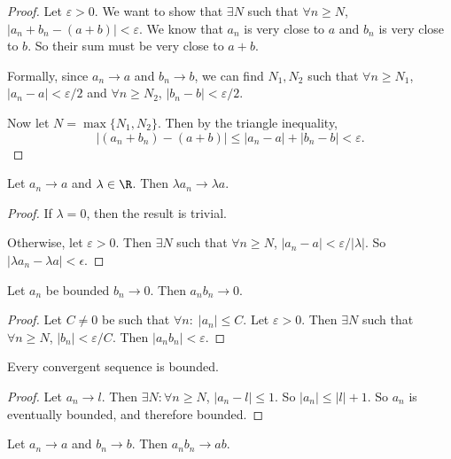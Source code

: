 \documentclass[a4paper]{article}
\begin{document}
\begin{proof}
  Let $\varepsilon > 0$. We want to show that $\exists N$ such that $\forall n \geq N$, $|a_n + b_n - (a+b)| < \varepsilon$. We know that $a_n$ is very close to $a$ and $b_n$ is very close to $b$. So their sum must be very close to $a + b$.
  
  Formally, since $a_n\to a$ and $b_n \to b$, we can find $N_1, N_2$ such that $\forall n \geq N_1$, $|a_n - a| < \varepsilon/2$ and $\forall n \geq N_2$, $|b_n - b| < \varepsilon/2$.

  Now let $N = \max\{N_1, N_2\}$. Then by the triangle inequality, 
  \[
    |(a_n + b_n) - (a + b)| \leq |a_n - a| + |b_n - b| < \varepsilon.
  \]
\end{proof}

\begin{lemma}
  Let $a_n \to a$ and $\lambda \in \R$. Then $\lambda a_n \to \lambda a$. 
\end{lemma}

\begin{proof}
  If $\lambda = 0$, then the result is trivial.

  Otherwise, let $\varepsilon > 0$. Then $\exists N$ such that $\forall n \geq N$, $|a_n - a| < \varepsilon/|\lambda|$. So $|\lambda a_n - \lambda a| < \epsilon$.
\end{proof}

\begin{lemma}
  Let $a_n$ be bounded $b_n \to 0$. Then $a_nb_n \to 0$.
\end{lemma}

\begin{proof}
  Let $C\not=0$ be such that $\forall n:\; |a_n|\leq C$. Let $\varepsilon > 0$. Then $\exists N$ such that $\forall n\geq N$, $|b_n| < \varepsilon/C$. Then $|a_nb_n| < \varepsilon$. 
\end{proof}

\begin{lemma}
  Every convergent sequence is bounded.
\end{lemma}

\begin{proof}
  Let $a_n \to l$. Then $\exists N: \forall n \geq N$, $|a_n - l| \leq 1$. So $|a_n| \leq |l| + 1$. So $a_n$ is eventually bounded, and therefore bounded.
\end{proof}

\begin{lemma}
  Let $a_n\to a$ and $b_n\to b$. Then $a_nb_n\to ab$. 
\end{lemma}
\end{document}
